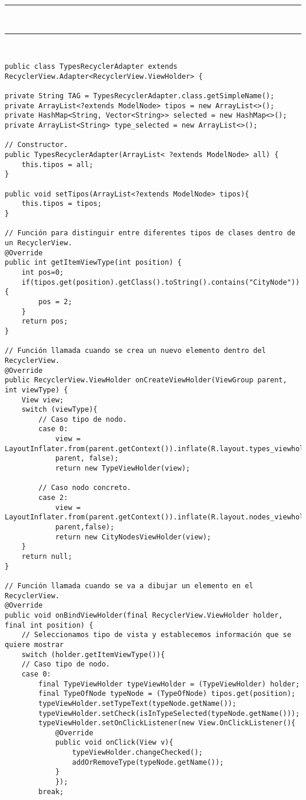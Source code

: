 \noindent\rule[-1ex]{\textwidth}{1pt}\\
\newpage
\noindent\rule[-1ex]{\textwidth}{1pt}\\
\begin{lstlisting}[caption=Código para crear una lista en Android.]
public class TypesRecyclerAdapter extends RecyclerView.Adapter<RecyclerView.ViewHolder> {

private String TAG = TypesRecyclerAdapter.class.getSimpleName();
private ArrayList<?extends ModelNode> tipos = new ArrayList<>();
private HashMap<String, Vector<String>> selected = new HashMap<>();
private ArrayList<String> type_selected = new ArrayList<>();

// Constructor.
public TypesRecyclerAdapter(ArrayList< ?extends ModelNode> all) {
	this.tipos = all;
}

public void setTipos(ArrayList<?extends ModelNode> tipos){
	this.tipos = tipos;
}

// Función para distinguir entre diferentes tipos de clases dentro de un RecyclerView.
@Override
public int getItemViewType(int position) {
	int pos=0;
	if(tipos.get(position).getClass().toString().contains("CityNode")){
		pos = 2;
	}
	return pos;
}

// Función llamada cuando se crea un nuevo elemento dentro del RecyclerView.
@Override
public RecyclerView.ViewHolder onCreateViewHolder(ViewGroup parent, int viewType) {
	View view;
	switch (viewType){
		// Caso tipo de nodo.
		case 0:
			view = LayoutInflater.from(parent.getContext()).inflate(R.layout.types_viewholder,
			parent, false);
			return new TypeViewHolder(view);
		
		// Caso nodo concreto.
		case 2:
			view = LayoutInflater.from(parent.getContext()).inflate(R.layout.nodes_viewholder,
			parent,false);
			return new CityNodesViewHolder(view);
	}
	return null;
}

// Función llamada cuando se va a dibujar un elemento en el RecyclerView.
@Override
public void onBindViewHolder(final RecyclerView.ViewHolder holder, final int position) {
	// Seleccionamos tipo de vista y establecemos información que se quiere mostrar
	switch (holder.getItemViewType()){
	// Caso tipo de nodo.
	case 0:
		final TypeViewHolder typeViewHolder = (TypeViewHolder) holder;
		final TypeOfNode typeNode = (TypeOfNode) tipos.get(position);
		typeViewHolder.setTypeText(typeNode.getName());
		typeViewHolder.setCheck(isInTypeSelected(typeNode.getName()));
		typeViewHolder.setOnClickListener(new View.OnClickListener(){
			@Override
			public void onClick(View v){
				typeViewHolder.changeChecked();
				addOrRemoveType(typeNode.getName());
			}
			});
		break;
	

\end{lstlisting}
